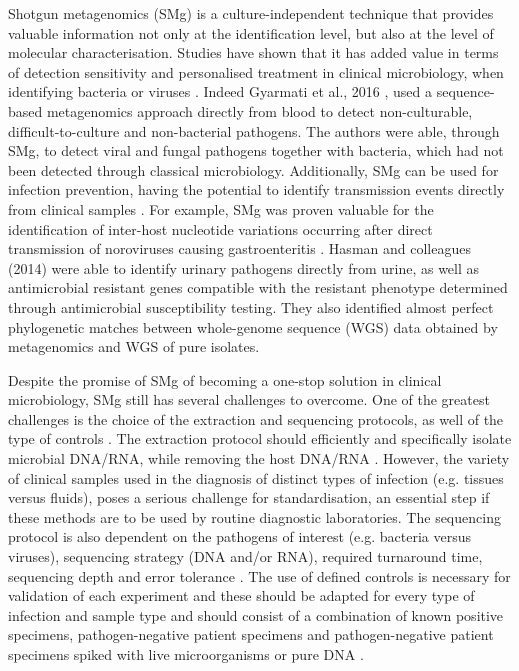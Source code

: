Shotgun metagenomics (SMg) is a culture-independent technique that provides valuable information not only at the identification level, but also at the level of molecular characterisation. 
Studies have shown that it has added value in terms of detection sensitivity and personalised treatment in clinical microbiology, when identifying bacteria \citep{hasman_rapid_2014, willmann_antibiotic_2015} or viruses \citep{graf_unbiased_2016}. 
Indeed Gyarmati et al., 2016 \citep{gyarmati_metagenomic_2016}, used a sequence-based metagenomics approach directly from blood to detect non-culturable, difficult-to-culture and non-bacterial pathogens. 
The authors were able, through SMg, to detect viral and fungal pathogens together with bacteria, which had not been detected through classical microbiology. 
Additionally, SMg can be used for infection prevention, having the potential to identify transmission events directly from clinical samples \citep{olson_metagenomic_2017}. 
For example, SMg was proven valuable for the identification of inter-host nucleotide variations occurring after direct transmission of noroviruses causing gastroenteritis \citep{olson_metagenomic_2017}. 
Hasman and colleagues (2014) \citep{hasman_rapid_2014} were able to identify urinary pathogens directly from urine, as well as antimicrobial resistant genes compatible with the resistant phenotype determined through antimicrobial susceptibility testing. They also identified almost perfect phylogenetic matches between whole-genome sequence (WGS) data obtained by metagenomics and WGS of pure isolates. 

Despite the promise of SMg of becoming a one-stop solution in clinical microbiology, SMg still has several challenges to overcome. 
One of the greatest challenges is the choice of the extraction and sequencing protocols, as well of the type of controls \citep{schlaberg_validation_2017}. 
The extraction protocol should efficiently and specifically isolate microbial DNA/RNA, while removing the host DNA/RNA \citep{street_molecular_2017}. 
However, the variety of clinical samples used in the diagnosis of distinct types of infection (e.g. tissues versus fluids), poses a serious challenge for standardisation, an essential step if these methods are to be used by routine diagnostic laboratories. 
The sequencing protocol is also dependent on the pathogens of interest (e.g. bacteria versus viruses), sequencing strategy (DNA and/or RNA), required turnaround time, sequencing depth and error tolerance \citep{schlaberg_validation_2017}. The use of defined controls is necessary for validation of each experiment and these should be adapted for every type of infection and sample type and should consist of a combination of known positive specimens, pathogen-negative patient specimens and pathogen-negative patient specimens spiked with live microorganisms or pure DNA \citep{schlaberg_validation_2017}.

